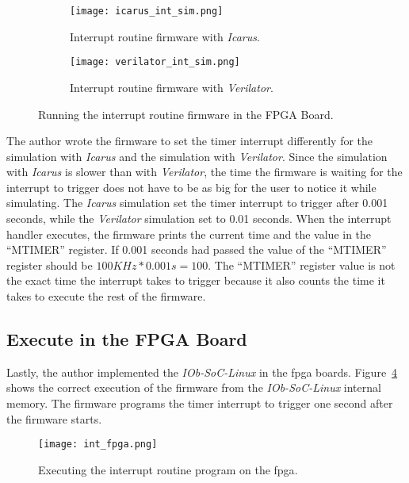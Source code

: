 \begin{figure}[!ht]
    \centering
    \begin{subfigure}[b]{0.49\textwidth}
        \centering
        \texttt{[image: icarus\_int\_sim.png]}
        \caption{Interrupt routine firmware with \textit{Icarus}.}
        \label{fig:icarus_int_sim}
    \end{subfigure}
    \hfill
    \begin{subfigure}[b]{0.49\textwidth}
        \centering
        \texttt{[image: verilator\_int\_sim.png]}
        \caption{Interrupt routine firmware with \textit{Verilator}.}
        \label{fig:verilator_int_sim}
    \end{subfigure}
    \caption{Running the interrupt routine firmware in the FPGA Board.}
    \label{fig:int_sim}
\end{figure}

The author wrote the firmware to set the timer interrupt differently for the simulation with \textit{Icarus} and the simulation with \textit{Verilator}. Since the simulation with \textit{Icarus} is slower than with \textit{Verilator}, the time the firmware is waiting for the interrupt to trigger does not have to be as big for the user to notice it while simulating. The \textit{Icarus} simulation set the timer interrupt to trigger after 0.001 seconds, while the \textit{Verilator} simulation set to 0.01 seconds. When the interrupt handler executes, the firmware prints the current time and the value in the \enquote{MTIMER} register. If 0.001 seconds had passed the value of the \enquote{MTIMER} register should be $100KHz*0.001s=100$. The \enquote{MTIMER} register value is not the exact time the interrupt takes to trigger because it also counts the time it takes to execute the rest of the firmware.

\subsection{Execute in the FPGA Board}
Lastly, the author implemented the \textit{IOb-SoC-Linux} in the \acrshort{fpga} boards. Figure~\ref{fig:int_fpga} shows the correct execution of the firmware from the \textit{IOb-SoC-Linux} internal memory. The firmware programs the timer interrupt to trigger one second after the firmware starts.

\begin{figure}[!ht]
    \centering
    \texttt{[image: int\_fpga.png]}
    \caption{Executing the interrupt routine program on the \acrshort{fpga}.}
    \label{fig:int_fpga}
\end{figure}

